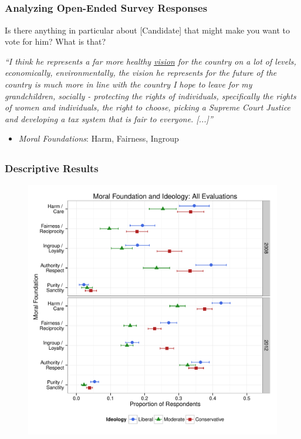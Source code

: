 \documentclass{beamer}
\begin{document}
\subsection{}
\begin{frame}%
  \frametitle{Analyzing Open-Ended Survey Responses}
\begin{exampleblock}{Is there anything in particular about [Candidate] that might make you want to vote for him? What is that?}
  \begin{center}
    \textit{``I think he represents a far more healthy \underline{vision} for the country on a lot of levels, economically, environmentally, the vision he represents for the future of the country is much more in line with the country I hope to leave for my grandchildren, socially - {\color{blue}protecting} the {\color{green}rights} of {\color{red}individuals}, specifically the {\color{green}rights} of women and {\color{red}individuals}, the right to choose, picking a Supreme Court {\color{green}Justice} and developing a tax system that is {\color{green}fair} to everyone. [...]''}
  \end{center}
\end{exampleblock}
  \begin{itemize}
  \item \emph{\textit{Moral Foundations}}: {\color{blue}Harm}, {\color{green}Fairness}, {\color{red}Ingroup}
  \end{itemize}
\end{frame}

\subsection{}
\begin{frame}%
  \frametitle{Descriptive Results}
  \begin{figure}[ht]\centering
    \includegraphics[height=.9\textheight]{../calc/fig/p1_mft_ideol}
  \end{figure}
\end{frame}
\end{document}
